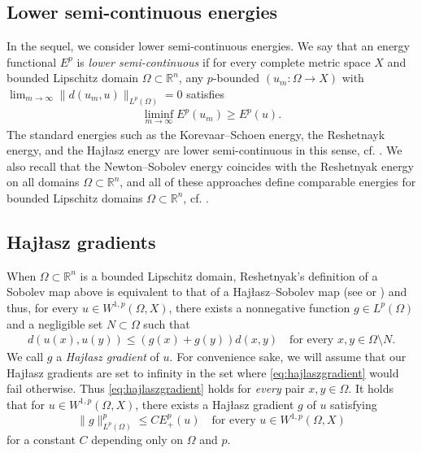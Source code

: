 \documentclass[a4paper,leqno]{amsart}
\numberwithin{equation}{section}
\theoremstyle{remark}
\theoremstyle{remark}
\newcommand{\R}{\mathbb{R}}
\begin{document}
\subsection{Lower semi-continuous energies}\label{section-lower-semi-continuous-energies}
In the sequel, we consider lower semi-continuous energies. We say that an energy functional $E^p$ is \emph{lower semi-continuous} if for every complete metric space $X$ and bounded Lipschitz domain $\Omega \subset \mathbb{R}^n$, any $p$-bounded $( u_m \colon \Omega \to X )$ with $\lim_{ m \to \infty } \| d( u_m, u ) \|_{ L^{p}(\Omega) } = 0$ satisfies
\begin{align*}
    \liminf_{ m \to \infty } E^{p}( u_m ) \geq E^{p}( u ).
\end{align*}
The standard energies such as the Korevaar--Schoen energy, the Reshetnayk energy, and the Haj{\l}asz energy are lower semi-continuous in this sense, cf. \cite[Section 5]{Lyt:Wen:17:areamini}. We also recall that the Newton--Sobolev energy coincides with the Reshetnyak energy on all domains $\Omega \subset \mathbb{R}^n$, and all of these approaches define comparable energies for bounded Lipschitz domains $\Omega \subset \mathbb{R}^n$, cf. \cite[Theorems 6.1.17 and 7.1.20 and Section 10]{Hei:Kos:Sha:Ty:15}. 

\subsection{Haj{\l}asz gradients}
When $\Omega \subset \R^n$ is a bounded Lipschitz domain, Reshetnyak's definition of a Sobolev map above is equivalent to that of a Haj{\l}asz--Sobolev map (see \cite{Haj:96} or \cite[Section 10]{Hei:Kos:Sha:Ty:15}) and thus, for every $u \in W^{1,p}( \Omega, X )$, there exists a nonnegative function $g \in L^{p}( \Omega )$ and a negligible set $N \subset \Omega$ such that
\begin{align}\label{eq:hajlaszgradient}
    d(u(x),u(y)) \leq ( g(x) + g(y) ) d(x,y) \quad\text{for every $x, y \in \Omega \setminus N$.}
\end{align}
We call $g$ a \emph{Haj{\l}asz gradient} of $u$. For convenience sake, we will assume that our Haj{\l}asz gradients are set to infinity in the set where \eqref{eq:hajlaszgradient} would fail otherwise. Thus \eqref{eq:hajlaszgradient} holds for \emph{every} pair $x,y \in \Omega$. It holds that for $u \in W^{1,p}( \Omega, X )$, there exists a Haj{\l}asz gradient $g$ of $u$ satisfying
\begin{equation}\label{eq:normestimate:hajlasz:sobolev}
    \| g \|_{ L^{p}(\Omega) }^p \leq C E^{p}_{+}( u )
    \quad\text{for every $u \in W^{1,p}( \Omega, X )$}
\end{equation}
for a constant $C$ depending only on $\Omega$ and $p$.
\end{document}
